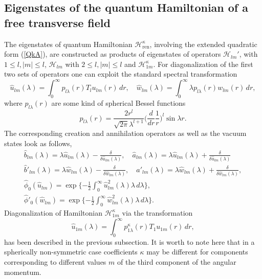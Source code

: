 \documentclass[12pt]{article}
\newcommand{\HH}{\mathscr{H}}
\begin{document}
\subsection{Eigenstates of the quantum Hamiltonian of a free transverse field}
	The eigenstates of quantum Hamiltonian
$ \HH_{\text{ren}}^{\kappa} $,
    involving the extended quadratic form
(\ref{QkA}),
	are constructed as products of eigenstates of operators
$ \HH_{lm}' $, with
$ 1\leq l, |m| \leq l $,
$ \HH_{lm} $ with
$ 2\leq l, |m| \leq l $ and
$ \HH_{1m}^{\kappa} $.
	For diagonalization of the first two sets of operators one can exploit
	the standard spectral transformation
\begin{equation*}
    \hat{u}_{lm}(\lambda)
	= \int_{0}^{\infty} p_{l\lambda}(r) T_{l} u_{lm}(r)\,dr ,
    \quad \hat{w}_{lm}(\lambda)
	= \int_{0}^{\infty} \lambda p_{l\lambda}(r) w_{lm}(r)\,dr ,
\end{equation*}
	where
$ p_{l\lambda}(r) $
	are some kind of spherical Bessel functions
\begin{equation*}
    p_{l\lambda}(r) = \frac{2r^{l}}{\sqrt{2\pi}\lambda^{l+1}}
	\bigl(\frac{d}{dr}\frac{1}{r}\bigr)^{l} \sin \lambda r .
\end{equation*}
	The corresponding creation and annihilation operators as well as the
	vacuum states look as follows,
\begin{gather*}
    \hat{b}_{lm}(\lambda) = \lambda \hat{u}_{lm}(\lambda)
	- \frac{\delta}{\delta \hat{u}_{lm}(\lambda)} ,\quad
    \hat{a}_{lm}(\lambda) = \lambda \hat{u}_{lm}(\lambda) 
	+ \frac{\delta}{\delta \hat{u}_{lm}(\lambda)} \\
    \hat{b}'_{lm}(\lambda) = \lambda \hat{w}_{lm}(\lambda)
	- \frac{\delta}{\delta \hat{w}_{lm}(\lambda)} ,\quad
    \hat{a}'_{lm}(\lambda) = \lambda \hat{w}_{lm}(\lambda) 
	+ \frac{\delta}{\delta \hat{w}_{lm}(\lambda)} ,\\
    \hat{\phi}_{0}(\hat{u}_{lm}) = \exp\{-\frac{1}{2}
	\int_{0}^{\infty} \hat{u}_{lm}^{2}(\lambda) \lambda \,d\lambda \} ,\\
    \hat{\phi}'_{0}(\hat{w}_{lm}) = \exp\{-\frac{1}{2}
	\int_{0}^{\infty} \hat{w}_{lm}^{2}(\lambda) \lambda \,d\lambda \} .
\end{gather*}
	Diagonalization of Hamiltonian
$ \HH_{1m}^{\kappa} $
	via the transformation
\begin{equation*}
    \hat{u}_{1m}(\lambda) = \int_{0}^{\infty} p_{1\lambda}^{\kappa}(r)
	T_{1} u_{1m}(r)\,dr, 
\end{equation*}
	has been described in the previous subsection.
	It is worth to note here that in a spherically non-symmetric case
	coefficients
$ \kappa $
	may be different for components corresponding to different values
$ m $
	of the third component of the angular momentum.
\end{document}
